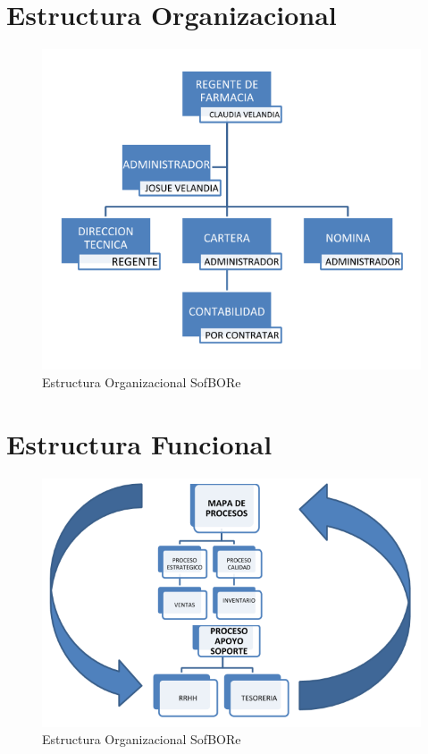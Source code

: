 \section{Estructura Organizacional}
\begin{figure}[htb]
	\centering
	 \includegraphics[width=1.0\linewidth]{libro/capitulo2/img/OrgRuzvel.PNG}
	\caption{Estructura Organizacional SofBORe}
\end{figure}
\newpage


\section{Estructura Funcional}
\begin{figure}[htb]
	\centering
	\includegraphics[width=1.0\linewidth]{libro/capitulo2/img/ProcesosRuzvel.PNG}
	\caption{Estructura Organizacional SofBORe}
\end{figure}
